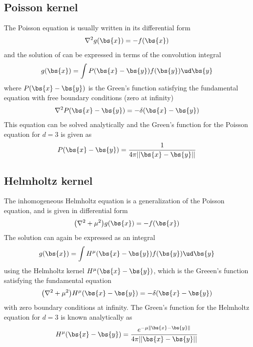 \subsection{Poisson kernel}
The Poisson equation is usually written in its differential form
\begin{equation}
    \nabla^2 g(\bs{x}) = -f(\bs{x})
\end{equation}
and the solution of can be expressed in terms of the convolution integral
\begin{equation}
    g(\bs{x}) = \int P(\bs{x}-\bs{y})f(\bs{y})\ud\bs{y}
\end{equation}
where $P(\bs{x}-\bs{y})$ is the Green's function satisfying the fundamental 
equation with free boundary conditions (zero at infinity)
\begin{equation}
    \label{eq:fundamental_poisson}
    \nabla^2 P(\bs{x}-\bs{y}) = -\delta(\bs{x}-\bs{y})
\end{equation}
This equation can be solved analytically and the Green's function for
the Poisson equation for $d=3$ is given as
\begin{equation}
    \label{eq:poisson_kern}
    P(\bs{x}-\bs{y}) = \frac{1}{4\pi||\bs{x}-\bs{y}||}
\end{equation}

\subsection{Helmholtz kernel}
The inhomogeneous Helmholtz equation is a generalization of the Poisson equation,
and is given in differential form
\begin{equation}
    \big(\nabla^2 + \mu^2\big) g(\bs{x}) = -f(\bs{x})
\end{equation}
The solution can again be expressed as an integral
\begin{equation}
    g(\bs{x}) = \int H^\mu(\bs{x}-\bs{y})f(\bs{y})\ud\bs{y}
\end{equation}
using the Helmholtz kernel $H^\mu(\bs{x}-\bs{y})$, which is the Greeen's function 
satisfying the fundamental equation
\begin{equation}
    \label{eq:fundamental_helmholtz}
    \big(\nabla^2 + \mu^2\big) H^\mu(\bs{x}-\bs{y}) = -\delta(\bs{x}-\bs{y})
\end{equation}
with zero boundary conditions at infinity. The Green's function for the Helmholtz 
equation for $d=3$ is known analytically as
\begin{equation}
    \label{eq:helmholtz_kern}
    H^\mu(\bs{x}-\bs{y}) = \frac{e^{-\mu\|\bs{x}-\bs{y}\|}}{4\pi||\bs{x}-\bs{y}||}
\end{equation}

